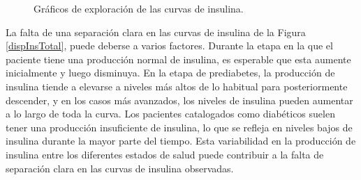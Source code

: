 \begin{figure}[H]
 \centering
    \caption{Gráficos de exploración de las curvas de insulina.}
    \label{fig:insulina}
\end{figure}

La falta de una separación clara en las curvas de insulina de la Figura \ref{dispInsTotal}, puede deberse a varios factores. Durante la etapa en la que el paciente tiene una producción normal de insulina, es esperable que esta aumente inicialmente y luego disminuya. En la etapa de prediabetes, la producción de insulina tiende a elevarse a niveles más altos de lo habitual para posteriormente descender, y en los casos más avanzados, los niveles de insulina pueden aumentar a lo largo de toda la curva. Los pacientes catalogados como diabéticos suelen tener una producción insuficiente de insulina, lo que se refleja en niveles bajos de insulina durante la mayor parte del tiempo. Esta variabilidad en la producción de insulina entre los diferentes estados de salud puede contribuir a la falta de separación clara en las curvas de insulina observadas.


